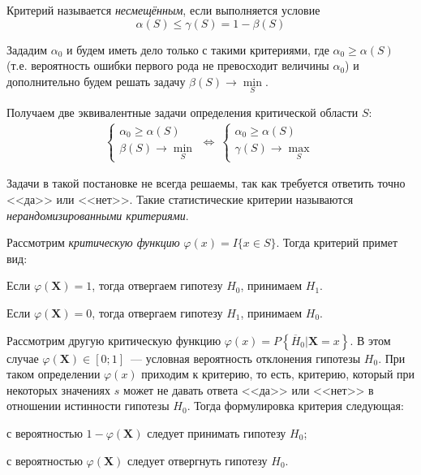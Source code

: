 \begin{defn}
    Критерий называется {\it несмещённым}, если выполняется условие
    \begin{equation*}
        \alpha(S) \leqslant \gamma(S)=1-\beta(S)
    \end{equation*}
\end{defn}

Зададим $\alpha_0$ и будем иметь дело только с такими критериями, где $\alpha_{0} \geqslant \alpha(S)$ (т.е. вероятность ошибки первого рода не превосходит величины $\alpha_0$) и дополнительно будем решать задачу $\beta(S) \rightarrow \min\limits_{S}$.

Получаем две эквивалентные задачи определения критической области $S$:
\begin{equation*}
    \begin{array}{l}
    \left\{\begin{array}{l}
    \alpha_{0} \geqslant \alpha(S) \\
    \beta(S) \rightarrow \min\limits_{S}
    \end{array}\right.
    \Leftrightarrow~
    \left\{\begin{array}{l}
    \alpha_{0} \geqslant \alpha(S) \\
    \gamma(S) \rightarrow \max\limits_{S}
    \end{array}\right.
    \end{array}
\end{equation*}

Задачи в такой постановке не всегда решаемы, так как требуется ответить точно <<да>> или <<нет>>. Такие статистические критерии называются {\it нерандомизированными критериями}.

\begin{exmp}
Рассмотрим {\it критическую функцию} $\varphi(x)=I\{x \in S\}$. Тогда критерий примет вид:
\begin{compactlist}
    \item Если $\varphi\left(\mathbf{X}\right)=1$, тогда отвергаем гипотезу $H_0$, принимаем $H_1$.
    \item Если $\varphi\left(\mathbf{X}\right)=0$, тогда отвергаем гипотезу $H_1$, принимаем $H_0$.
\end{compactlist}
\end{exmp}

\begin{exmp}
Рассмотрим другую критическую функцию $\varphi(x)=P\left\{\overline{H}_{0} | \mathbf{X}=x\right\}$. В этом случае $\varphi\left(\mathbf{X}\right) \in[0;1]$~--- условная вероятность отклонения гипотезы $H_0$. При таком определении $\varphi(x)$ приходим к { критерию}, то есть, критерию, который при некоторых значениях $s$ может не давать ответа <<да>> или <<нет>> в отношении истинности гипотезы $H_0$. Тогда формулировка критерия следующая:
\begin{compactlist}
    \item с вероятностью $1 - \varphi\left(\mathbf{X}\right)$ следует принимать гипотезу $H_0$;
    \item с вероятностью $\varphi\left(\mathbf{X}\right)$ следует отвергнуть гипотезу $H_0$.
\end{compactlist}
\end{exmp}

